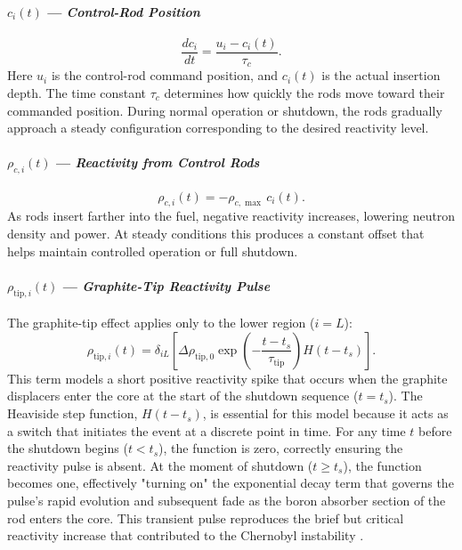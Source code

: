 \documentclass[11pt]{article}
\begin{document}
\paragraph{\textbf{$c_i(t)$ --- \textit{Control-Rod Position}}}
\begin{equation}
\frac{dc_i}{dt} = \frac{u_i - c_i(t)}{\tau_c}.
\end{equation}
Here $u_i$ is the control-rod command position, and $c_i(t)$ is the actual insertion depth. The time constant $\tau_c$ determines how quickly the rods move toward their commanded position. During normal operation or shutdown, the rods gradually approach a steady configuration corresponding to the desired reactivity level.

\paragraph{\textbf{$\rho_{c,i}(t)$ --- \textit{Reactivity from Control Rods}}}
\begin{equation}
\rho_{c,i}(t) = -\rho_{c,\max}\,c_i(t).
\end{equation}
As rods insert farther into the fuel, negative reactivity increases, lowering neutron density and power. At steady conditions this produces a constant offset that helps maintain controlled operation or full shutdown.

\paragraph{\textbf{$\rho_{\mathrm{tip},i}(t)$ --- \textit{Graphite-Tip Reactivity Pulse}}}
The graphite-tip effect applies only to the lower region ($i=L$):
\begin{equation}
\rho_{\mathrm{tip},i}(t) =
\delta_{iL}
\left[
\Delta\rho_{\mathrm{tip},0}
\exp\left(-\frac{t - t_s}{\tau_{\mathrm{tip}}}\right)
H(t - t_s)
\right].
\end{equation}
This term models a short positive reactivity spike that occurs when the graphite displacers enter the core at the start of the shutdown sequence ($t=t_s$). The Heaviside step function, $H(t - t_s)$, is essential for this model because it acts as a switch that initiates the event at a discrete point in time. For any time $t$ before the shutdown begins ($t < t_s$), the function is zero, correctly ensuring the reactivity pulse is absent. At the moment of shutdown ($t \ge t_s$), the function becomes one, effectively "turning on" the exponential decay term that governs the pulse's rapid evolution and subsequent fade as the boron absorber section of the rod enters the core. This transient pulse reproduces the brief but critical reactivity increase that contributed to the Chernobyl instability \cite{INSAG7,Malko2002,INIS_Multidimensional}.
\end{document}

